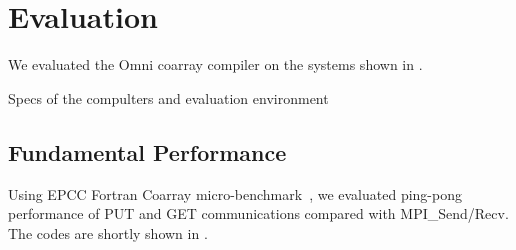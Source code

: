 \section{Evaluation}\label{sec:eval}

We evaluated the Omni coarray compiler on the systems shown in .

\begin{table}
 \caption{Specs of the compulters and evaluation environment}\label{tab:specs}
 \begin{center}\small
  
 \end{center}
\end{table}


\subsection{Fundamental Performance}


Using EPCC Fortran Coarray micro-benchmark~\cite{EPCC}, we evaluated ping-pong performance 
of PUT and GET communications compared with MPI\_Send/Recv.
The codes are shortly shown in .

